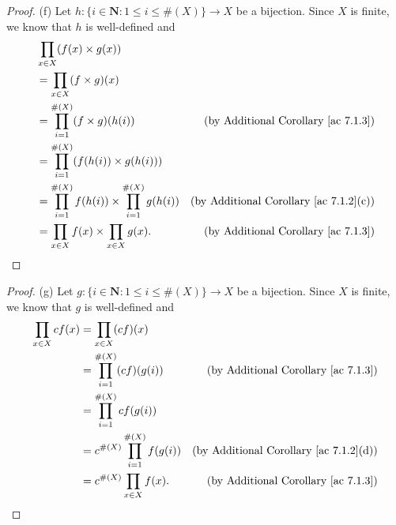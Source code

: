 \begin{proof}{(f)}
    Let \(h : \{i \in \mathbf{N} : 1 \leq i \leq \#(X)\} \to X\) be a bijection.
    Since \(X\) is finite, we know that \(h\) is well-defined and
    \begin{align*}
         & \prod_{x \in X} (f(x) \times g(x))                                                                                        \\
         & = \prod_{x \in X} (f \times g)(x)                                                                                         \\
         & = \prod_{i = 1}^{\#(X)} (f \times g)(h(i))                           & \text{(by Additional Corollary \ref{ac 7.1.3})}    \\
         & = \prod_{i = 1}^{\#(X)} (f(h(i)) \times g(h(i)))                                                                          \\
         & = \prod_{i = 1}^{\#(X)} f(h(i)) \times \prod_{i = 1}^{\#(X)} g(h(i)) & \text{(by Additional Corollary \ref{ac 7.1.2}(c))} \\
         & = \prod_{x \in X} f(x) \times \prod_{x \in X} g(x).                  & \text{(by Additional Corollary \ref{ac 7.1.3})}
    \end{align*}
\end{proof}

\begin{proof}{(g)}
    Let \(g : \{i \in \mathbf{N} : 1 \leq i \leq \#(X)\} \to X\) be a bijection.
    Since \(X\) is finite, we know that \(g\) is well-defined and
    \begin{align*}
        \prod_{x \in X} cf(x) & = \prod_{x \in X} (cf)(x)                                                                      \\
                              & = \prod_{i = 1}^{\#(X)} (cf)(g(i))        & \text{(by Additional Corollary \ref{ac 7.1.3})}    \\
                              & = \prod_{i = 1}^{\#(X)} cf(g(i))                                                               \\
                              & = c^{\#(X)} \prod_{i = 1}^{\#(X)} f(g(i)) & \text{(by Additional Corollary \ref{ac 7.1.2}(d))} \\
                              & = c^{\#(X)} \prod_{x \in X} f(x).         & \text{(by Additional Corollary \ref{ac 7.1.3})}
    \end{align*}
\end{proof}

